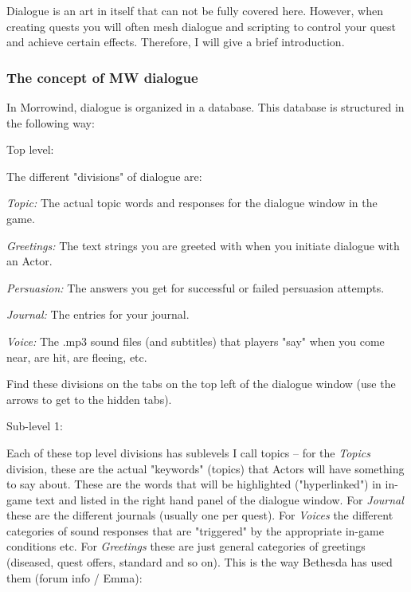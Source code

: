 \documentclass[
]{article}
\begin{document}
Dialogue is an art in itself that can not be fully covered here.
However, when creating quests you will often mesh dialogue and scripting
to control your quest and achieve certain effects. Therefore, I will
give a brief introduction.

\hypertarget{the-concept-of-mw-dialogue}{%
\subsubsection{The concept of MW
dialogue}\label{the-concept-of-mw-dialogue}}

In Morrowind, dialogue is organized in a database. This database is
structured in the following way:

Top level:

The different "divisions" of dialogue are:

\emph{Topic:} The actual topic words and responses for the dialogue
window in the game.

\emph{Greetings:} The text strings you are greeted with when you
initiate dialogue with an Actor.

\emph{Persuasion:} The answers you get for successful or failed
persuasion attempts.

\emph{Journal:} The entries for your journal.

\emph{Voice:} The .mp3 sound files (and subtitles) that players "say"
when you come near, are hit, are fleeing, etc.

Find these divisions on the tabs on the top left of the dialogue window
(use the arrows to get to the hidden tabs).

Sub-level 1:

Each of these top level divisions has sublevels I call topics -- for the
\emph{Topics} division, these are the actual "keywords" (topics) that
Actors will have something to say about. These are the words that will
be highlighted ("hyperlinked") in in-game text and listed in the right
hand panel of the dialogue window. For \emph{Journal} these are the
different journals (usually one per quest). For \emph{Voices} the
different categories of sound responses that are "triggered" by the
appropriate in-game conditions etc. For \emph{Greetings} these are just
general categories of greetings (diseased, quest offers, standard and so
on). This is the way Bethesda has used them (forum info / Emma):
\end{document}
